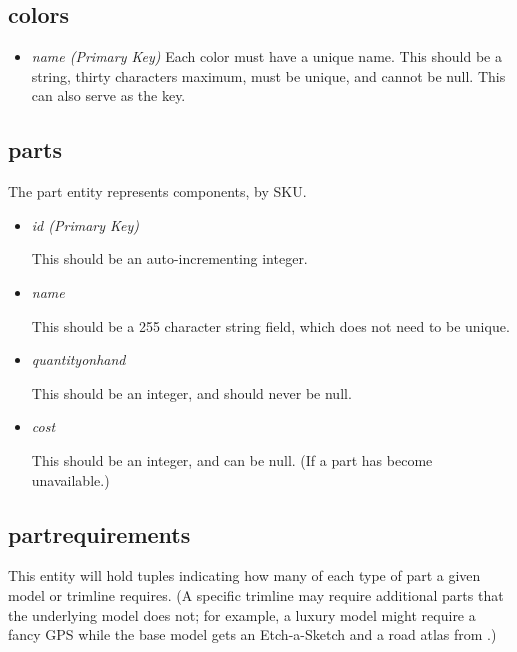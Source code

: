 \documentclass[11pt,letterpaper,oneside]{amsart}
\begin{document}
\subsection*{colors}

\begin{itemize}
	\item \emph	{name (Primary Key)}
		Each color must have a unique name.  This should be a string, thirty characters maximum, must be unique, and cannot be null.  This can also serve as the key.
		
\end{itemize}

\subsection*{parts}

The part entity represents components, by SKU.

\begin{itemize}

\item \emph{id (Primary Key)}

	This should be an auto-incrementing integer.
	
\item \emph{name}

	This should be a 255 character string field, which does not need to be unique.
	
\item \emph{quantity{\textunderscore}on{\textunderscore}hand}

	This should be an integer, and should never be null.
	
\item \emph{cost}

	This should be an integer, and can be null. (If a part has become unavailable.)
	
\end{itemize}

\subsection*{part{\textunderscore}requirements}

This entity will hold tuples indicating how many of each type of part a given model or trimline requires.  (A specific trimline may require additional parts that the underlying model does not; for example, a luxury model might require a fancy GPS while the base model gets an Etch-a-Sketch and a road atlas from .)
\end{document}
